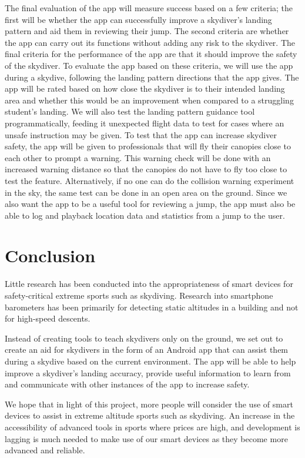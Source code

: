 \documentclass[11pt, a4paper, twocolumn]{article}
\begin{document}
The final evaluation of the app will measure success based on a few criteria; the first will be whether the app can successfully improve a skydiver's landing pattern and aid them in reviewing their jump. The second criteria are whether the app can carry out its functions without adding any risk to the skydiver. The final criteria for the performance of the app are that it should improve the safety of the skydiver. To evaluate the app based on these criteria, we will use the app during a skydive, following the landing pattern directions that the app gives. The app will be rated based on how close the skydiver is to their intended landing area and whether this would be an improvement when compared to a struggling student's landing. We will also test the landing pattern guidance tool programmatically, feeding it unexpected flight data to test for cases where an unsafe instruction may be given. To test that the app can increase skydiver safety, the app will be given to professionals that will fly their canopies close to each other to prompt a warning. This warning check will be done with an increased warning distance so that the canopies do not have to fly too close to test the feature. Alternatively, if no one can do the collision warning experiment in the sky, the same test can be done in an open area on the ground. Since we also want the app to be a useful tool for reviewing a jump, the app must also be able to log and playback location data and statistics from a jump to the user.

\section{Conclusion}\label{sec:conclusion} %

Little research has been conducted into the appropriateness of smart devices for safety-critical extreme sports such as skydiving. Research into smartphone barometers has been primarily for detecting static altitudes in a building and not for high-speed descents.

Instead of creating tools to teach skydivers only on the ground, we set out to create an aid for skydivers in the form of an Android app that can assist them during a skydive based on the current environment. The app will be able to help improve a skydiver's landing accuracy, provide useful information to learn from and communicate with other instances of the app to increase safety.


We hope that in light of this project, more people will consider the use of smart devices to assist in extreme altitude sports such as skydiving. An increase in the accessibility of advanced tools in sports where prices are high, and development is lagging is much needed to make use of our smart devices as they become more advanced and reliable.

\printbibliography{}
\end{document}
